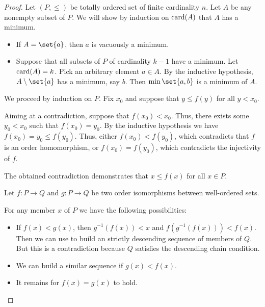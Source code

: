 \begin{proof}
   Let \( (P, \leq) \) be totally ordered set of finite cardinality \( n \). Let \( A \) be any nonempty subset of \( P \). We will show by induction on \( \operatorname{card}(A) \) that \( A \) has a minimum.

  \begin{itemize}
    \item If \( A = \set{ a } \), then \( a \) is vacuously a minimum.
    \item Suppose that all subsets of \( P \) of cardinality \( k - 1 \) have a minimum. Let \( \operatorname{card}(A) = k \). Pick an arbitrary element \( a \in A \). By the inductive hypothesis, \( A \setminus \set{ a } \) has a minimum, say \( b \). Then \( \min\set{ a, b } \) is a minimum of \( A \).
  \end{itemize}

   We proceed by induction on \( P \). Fix \( x_0 \) and suppose that \( y \leq f(y) \) for all \( y < x_0 \).

  Aiming at a contradiction, suppose that \( f(x_0) < x_0 \). Thus, there exists some \( y_0 < x_0 \) such that \( f(x_0) = y_0 \). By the inductive hypothesis we have \( f(x_0) = y_0 \leq f(y_0) \). Thus, either \( f(x_0) < f(y_0) \), which contradicts that \( f \) is an order homomorphism, or \( f(x_0) = f(y_0) \), which contradicts the injectivity of \( f \).

  The obtained contradiction demonstrates that \( x \leq f(x) \) for all \( x \in P \).

   Let \( f: P \to Q \) and \( g: P \to Q \) be two order isomorphisms between well-ordered sets.

  For any member \( x \) of \( P \) we have the following possibilities:
  \begin{itemize}
    \item If \( f(x) < g(x) \), then \( g^{-1}(f(x)) < x \) and \( f(g^{-1}(f(x))) < f(x) \). Then we can use  to build an strictly descending sequence of members of \( Q \). But this is a contradiction because \( Q \) satisfies the descending chain condition.

    \item We can build a similar sequence if \( g(x) < f(x) \).

    \item It remains for \( f(x) = g(x) \) to hold.
  \end{itemize}


\end{proof}
